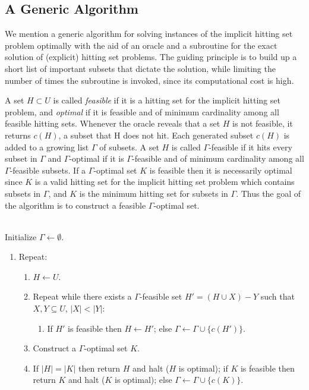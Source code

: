 \documentclass[11pt]{article}
\begin{document}
\subsection{A Generic Algorithm}
We mention a generic algorithm for solving instances of the implicit hitting
set problem optimally with the aid of an oracle and a subroutine for the exact solution of (explicit) hitting set problems. The guiding principle is to build up a short list of important subsets that dictate the solution, while limiting the number of times the subroutine is invoked, since its computational cost is
high.

A set $H \subset U$ is called {\it feasible} if it is a hitting set for the
implicit hitting set problem, and {\it optimal} if it is feasible and of
minimum cardinality among all feasible  hitting sets. Whenever the  oracle reveals
that a set $H$ is not feasible, it returns  $c(H)$, a subset that H does not
hit. Each generated subset $c(H)$ is added to a growing list
$\Gamma$ of subsets. A set $H$ is called $\Gamma$-feasible if it hits every
subset in $\Gamma$ and $\Gamma$-optimal if it is $\Gamma$-feasible and of
minimum cardinality among all $\Gamma$-feasible subsets. If a $\Gamma$-optimal set $K$
is feasible then it is necessarily optimal since $K$ is a valid hitting set for the implicit hitting set problem which contains subsets in $\Gamma$, and $K$ is the minimum hitting set for subsets in $\Gamma$. Thus the goal of the algorithm is to construct a feasible $\Gamma$-optimal set. 

\\
\noindent Initialize $\Gamma \leftarrow \emptyset$.
\begin{enumerate}
\item Repeat:
\begin{enumerate}
\item $H\leftarrow U$.
\item Repeat while there exists a $\Gamma$-feasible set $H' = (H \cup X) - Y$ such that $X,Y\subseteq U$, $|X|<|Y|$:
	\begin{enumerate}
	\item If $H'$ is feasible then $H\leftarrow H'$; else $\Gamma \leftarrow \Gamma \cup \{c(H')\}$.
	\end{enumerate}
\item Construct a $\Gamma$-optimal set $K$.
\item If $|H|=|K|$ then return $H$ and halt ($H$ is optimal); if $K$ is feasible then return $K$ and halt ($K$ is optimal); else $\Gamma \leftarrow \Gamma \cup \{c(K)\}$.
\end{enumerate}
\end{enumerate}
\end{document}
